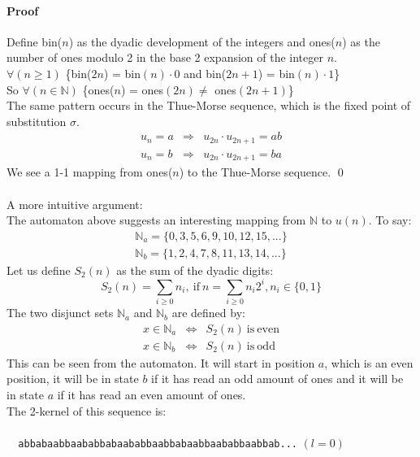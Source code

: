 \documentclass{article}
\begin{document}
\paragraph{Proof} Define bin($n$) as the dyadic development of the integers and
ones($n$) as the number of ones modulo 2 in the base 2 expansion of the integer
$n$.\\
$\forall (n \ge 1)$ \{bin($2n$) = bin$(n) \cdot 0$ and bin($2n + 1$) =
bin$(n) \cdot 1$\}\\
So $\forall (n \in \mathbb{N})$ \{ones($n$) = ones$(2n) \ne$ ones$(2n + 1)$\}\\
The same pattern occurs in the Thue-Morse sequence, which is the fixed point
of substitution $\sigma$.
\begin{eqnarray*}
u_n = a &\Rightarrow& u_{2n} \cdot u_{2n + 1} = ab\\
u_n = b &\Rightarrow& u_{2n} \cdot u_{2n + 1} = ba
\end{eqnarray*}
We see a 1-1 mapping from ones($n$) to the Thue-Morse sequence. \qed\\
\\
A more intuitive argument:\\
The automaton above suggests an interesting mapping from $\mathbb{N}$ to
$u(n)$. To say:
\begin{eqnarray*}
\mathbb{N}_a = \{0, 3, 5, 6, 9, 10, 12, 15, ...\}\\
\mathbb{N}_b = \{1, 2, 4, 7, 8, 11, 13, 14, ...\}
\end{eqnarray*}
Let us define $S_2(n)$ as the sum of the dyadic digits:
\begin{displaymath}
S_2(n) = \sum_{i \ge 0}n_i,\mathrm{\ if\ }
n = \sum_{i \ge 0}n_i2^i, n_i \in \{0, 1\}
\end{displaymath}
The two disjunct sets $\mathbb{N}_a$ and $\mathbb{N}_b$ are defined by:
\begin{eqnarray*}
x \in \mathbb{N}_a &\Leftrightarrow& S_2(n) \mathrm{\ is\ even}\\
x \in \mathbb{N}_b &\Leftrightarrow& S_2(n) \mathrm{\ is\ odd}
\end{eqnarray*}
This can be seen from the automaton. It will start in position $a$,
which is an even position, it will be in state $b$ if it has read an odd
amount of ones and it will be in state $a$ if it has read an even amount
of ones.\\
The 2-kernel of this sequence is:\\
\\
\verb#  abbabaabbaababbabaababbaabbabaabbaababbaabbab...# $(l = 0)$\\
\end{document}
